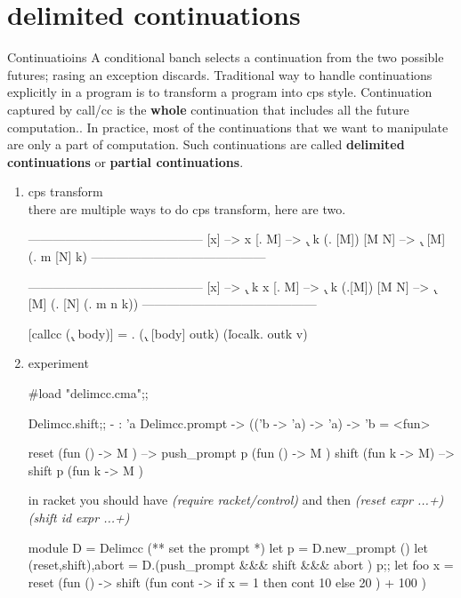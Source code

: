 \section{delimited continuations}
\label{sec:cont-delim-cont}
Continuatioins
A conditional banch selects a continuation from the two possible
futures; rasing an exception discards. Traditional way to handle
continuations explicitly in a program is to transform a program into
cps style. Continuation captured by call/cc is the {\bf whole} continuation
that includes all the future computation.. In practice, most of the
continuations that we want to manipulate are only a part of
computation. Such continuations are called {\bf delimited continuations} or
{\bf partial continuations}.


\begin{enumerate}
\item cps transform \\
  there are multiple ways to do cps transform, here are two.

  
  \begin{bluetext}
------------------------------------------
   [x] --> x
   [\x. M] --> \k . k (\x . [M])
   [M N] --> \k. [M] (\m . m [N] k)
------------------------------------------


------------------------------------------
   [x] --> \k . k x
   [\x. M] --> \k. k (\x.[M])
   [M N] --> \k. [M] (\m . [N] (\n. m n k))
------------------------------------------


[callcc (\k. body)] = \outk. (\k. [body] outk) (\v localk. outk v)
   
  \end{bluetext}

  
\item experiment

\begin{alternate}
#load "delimcc.cma";;
\end{alternate}
\begin{alternate}
Delimcc.shift;;
- : 'a Delimcc.prompt -> (('b -> 'a) -> 'a) -> 'b = <fun>
\end{alternate}

\begin{bluetext}
reset (fun () -> M ) --> push_prompt p (fun () -> M )
shift (fun k -> M) --> shift p (fun k -> M )
\end{bluetext}
in racket you should have \textit{(require racket/control)}
and then \textit{(reset expr ...+)}
\textit{(shift id expr ...+)}


\begin{ocamlcode}
module D = Delimcc
(** set the prompt *)  
let p = D.new_prompt ()
let (reset,shift),abort  = D.(push_prompt &&& shift &&& abort ) p;;
let foo x = reset (fun () -> shift (fun cont -> if x = 1 then cont 10 else 20 ) + 100 )
\end{ocamlcode}


\end{enumerate}
